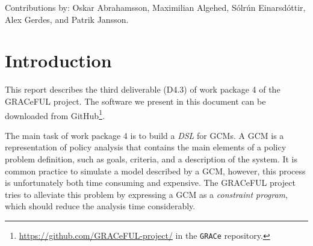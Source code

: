 \documentclass{article}
\newcommand{\grace}{GRACeFUL\xspace}
\begin{document}
Contributions by: Oskar Abrahamsson, Maximilian Algehed, Sólrún
Einarsdóttir, Alex Gerdes, and Patrik Jansson.

\begin{abstract}

This third deliverable (D4.3) of work package 4 presents the
translation of GRACeFUL concept maps (expressed as GRACe programs) to
the Constraint Functional Programming (CFP) layer.
%
GRACe programs model the system dynamics of GRACeFUL Concept Maps and
the CFP layer is used to compute model solutions.
%
This report builds on the description of GRACe in ``D4.2: A Domain
Specific Language (DSL) for GRACeFUL Concept Maps'' (delivered in
project month 24) and the third release of the CFP layer ``haskelzinc''.
%
(The first release was described in ``D5.1: Domain-Specific Language
for the Constraint Functional Programming Platform'' and the latest
version is available from the Haskell package repository
\href{https://hackage.haskell.org/package/haskelzinc}{Hackage}.)
%
The work leading up to this deliverable is within Task 4.4 ``implement
a middleware for connecting the DSL to the CFP layer'' and the full
source code of the implementation is available on GitHub.


\end{abstract}

\vfill

\setcounter{tocdepth}{2}
\tableofcontents

\vfill


\newpage

\section{Introduction}

This report describes the third deliverable (D4.3) of work package 4
of the \grace project. The software we present in this document can be
downloaded from
GitHub\footnote{\url{https://github.com/GRACeFUL-project/} in the
  \texttt{GRACe} repository.}.

The main task of work package 4 is to build a \emph{\ac{DSL}} for \acp{GCM}. A
\ac{GCM} is a representation of policy analysis that contains the main elements
of a policy problem definition, such as goals, criteria, and a description of
the system. It is common practice to simulate a model described by a \ac{GCM},
however, this process is unfortunately both time consuming and expensive. The
\grace project tries to alleviate this problem by expressing a \ac{GCM} as a
\emph{constraint program}, which should reduce the analysis time considerably.
\end{document}
